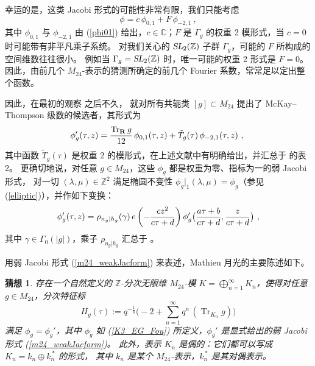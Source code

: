 \documentclass[11pt,a4paper,fontset=windows]{ctexart}
\newtheorem{conj}[thm]{猜想}
\numberwithin{equation}{section}
\newcommand{\SL}{\operatorname{\textsl{SL}}}      %
\newcommand{\CC}{\mathbb{C}}
\newcommand{\ZZ}{\mathbb{Z}}
\newcommand{\Z}{\mathbb{Z}}
\def\f{\phi}
\def\inf{\infty}
\def\l{\lambda}
\def\m{\mu}
\def\r{\rho}
\def\t{\tau}
\def\til{\tilde}
\newcommand{\tr}{\operatorname{Tr}}
\newcommand{\be}{\begin{equation}}
\newcommand{\ee}{\end{equation}}
\newcommand{\eq}[1]{(\ref{#1})}
\begin{document}
幸运的是，这类 Jacobi 形式的可能性非常有限，我们只能考虑
\be
\phi = c\, \phi_{0,1} + F \,\phi_{-2,1}~,
\ee
其中 $\phi_{0,1}$ 与 $\phi_{-2,1}$ 由 (\ref{phi01}) 给出，$c\in \CC$；$F$ 是 $\Gamma_g$ 的权重 2 模形式，当 $c=0$ 时可能带有非平凡乘子系统。
对我们关心的 $\SL_2(\Z)$ 子群 $\Gamma_g$，可能的 $F$ 所构成的空间维数往往很小。
例如当 $\Gamma_g = \SL_2(\Z)$ 时，唯一可能的权重 2 形式是 $F=0$。
因此，由前几个 $M_{24}$-表示的猜测所确定的前几个 Fourier 系数，常常足以定出整个函数。


因此，在最初的观察 \cite{Eguchi2010} 之后不久，\cite{cheng2010k3 ,Gaberdiel2010,Gaberdiel2010a,Eguchi2010a}
就对所有共轭类 $[g]\subset M_{24}$ 提出了 McKay--Thompson 级数的候选者，其形式为
\be\label{m24_weakJacform}
{\phi}'_g(\t,z)= \frac{\tr_{\bf R} {g } }{12}\, \phi_{0,1}(\t,z) + \til T_g(\t) \, \phi_{-2,1}(\t,z)~,\;\ee 
其中函数 $\tilde{T}_g(\t)$ 是权重 2 的模形式，在上述文献中有明确给出，并汇总于 \cite{cheng2011largest} 的表 2。
更确切地说，对任意 $g\in M_{24}$，这些 $\phi_g$ 都是权重为零、指标为一的弱 Jacobi 形式，
对一切 $(\l,\m)\in \ZZ^2$ 满足椭圆不变性 $\f_g\lvert_{1} (\l,\m)  = \phi_g$（参见 \eq{elliptic}），并作如下变换：
$$  
{\phi}'_g(\t,z)=\r_{n_g|h_g}(\gamma) \,e\left(-\frac{c z^2}{c\t+d}\right) {\phi}'_g\big({a\t+b\over c\t+d},{z\over c\t+d}\big)~ ,
$$
其中 $\gamma \in\Gamma_0(|g|)$，乘子 $\r_{n_g|h_g}$ 汇总于 \cite{cheng2011largest}。

用弱 Jacobi 形式 (\ref{m24_weakJacform}) 来表述，Mathieu 月光的主要陈述如下。
\begin{conj}\label{conj_mock}
存在一个自然定义的 $\Z$-分次无限维 $M_{24}$-模 $K= \bigoplus_{n=1}^\inf  K_n$，使得对任意 $g\in M_{24}$，分次特征标
\be\label{rep_mock}
H_g(\t) :=q^{-\frac{1}{8}}\big( -2  + \sum_{n=1}^\inf q^n\,(\tr_{K_n} g)\big)
\ee
满足 $\phi_g = \phi_g'$，其中 $\phi_g$ 如 \eq{K3_EG_Fou} 所定义，$\phi_g'$ 是显式给出的弱 Jacobi 形式 \eq{m24_weakJacform}。
此外，表示 $K_n$ 是偶的：它们都可以写成 $K_n=k_n\oplus k_n ^{\,\ast}$ 的形式，
其中 $k_n$ 是某个 $M_{24}$-表示，$k_n ^{\,\ast}$ 是其对偶表示。
\end{conj}

\end{document}
